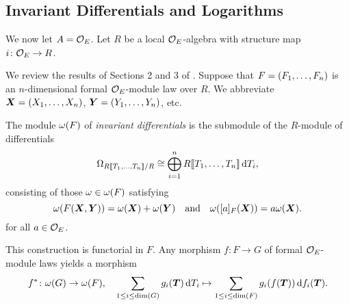 \documentclass[../main.tex]{subfiles}
\begin{document}

\subsection{Invariant Differentials and Logarithms} %
\label{sub:Logarithms}
We now let $A = {\mathcal{O}_E}$. Let $R$ be a local ${\mathcal{O}_E}$-algebra with structure
map $i\colon  {\mathcal{O}_E} \to R$.

We review the results of Sections
2 and 3 of \cite{hopkins1994equivariant}. 
Suppose that ${F} = (F_1, \dots, F_n)$ is an $n$-dimensional formal ${\mathcal{O}_E}$-module
law over $R$. We abbreviate $\boldsymbol{X} = (X_1, \dots, X_n)$, $\boldsymbol{Y} = (Y_1,
\dots, Y_n)$, etc.

\begin{defi}
  The module $\omega({F})$ of \emph{invariant differentials} is the submodule of the
  $R$-module of differentials
  \begin{equation*}
    \Omega_{R\llbracket T_1, \dots, T_n \rrbracket/R} \cong \bigoplus_{i=1}^n R\llbracket T_1,
    \dots, T_n
    \rrbracket \, \mathrm{d} T_i,
  \end{equation*}
  consisting of those $\omega \in \omega({F})$ satisfying
  \begin{equation}\label{eq:diffcond}
    \omega({F}(\boldsymbol{X},\boldsymbol{Y})) = \omega(\boldsymbol{X}) + \omega(\boldsymbol{Y})\quad \text{and} \quad
    \omega([a]_{F}(\boldsymbol{X})) = a\omega(\boldsymbol{X}).
  \end{equation} 
  for all $a \in {\mathcal{O}_E}$. 
\end{defi}

This construction is functorial in $F$. Any morphism $f\colon F \to G$ 
of formal ${\mathcal{O}_E}$-module laws yields a morphism 
$$ f^*\colon \omega(G) \to \omega(F), \quad \sum_{1 \leq i \leq \dim(G)} g_i(\boldsymbol T)
\, \mathrm{d} T_i  \mapsto \sum_{1 \leq i \leq \dim(F)} g_i(f(\boldsymbol T)) \, \mathrm{d} f_i(\boldsymbol T).$$
\end{document}
